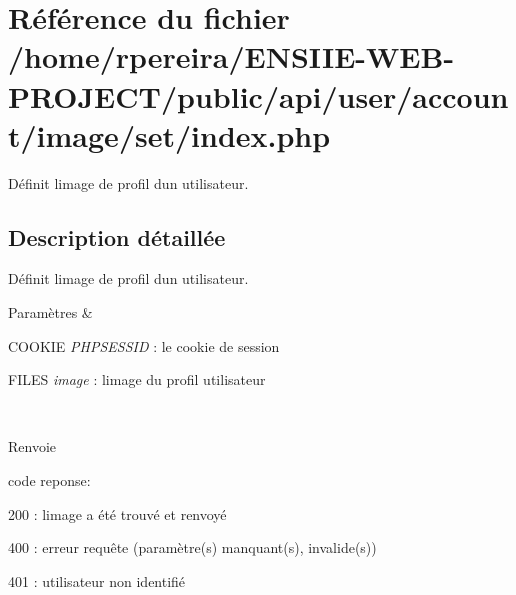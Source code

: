 \hypertarget{user_2account_2image_2set_2index_8php}{}\section{Référence du fichier /home/rpereira/\+E\+N\+S\+I\+I\+E-\/\+W\+E\+B-\/\+P\+R\+O\+J\+E\+C\+T/public/api/user/account/image/set/index.php}
\label{user_2account_2image_2set_2index_8php}


Définit l\textquotesingle{}image de profil d\textquotesingle{}un utilisateur.  




\subsection{Description détaillée}
Définit l\textquotesingle{}image de profil d\textquotesingle{}un utilisateur. 


\begin{DoxyParams}{Paramètres}
{\em } & 
\begin{DoxyItemize}
\item C\+O\+O\+K\+IE {\itshape P\+H\+P\+S\+E\+S\+S\+ID} \+: le cookie de session
\item F\+I\+L\+ES {\itshape image} \+: l\textquotesingle{}image du profil utilisateur 
\end{DoxyItemize}\\
\hline
\end{DoxyParams}
\begin{DoxyReturn}{Renvoie}

\begin{DoxyItemize}
\item code reponse\+:
\begin{DoxyItemize}
\item 200 \+: l\textquotesingle{}image a été trouvé et renvoyé
\item 400 \+: erreur requête (paramètre(s) manquant(s), invalide(s))
\item 401 \+: utilisateur non identifié 
\end{DoxyItemize}
\end{DoxyItemize}
\end{DoxyReturn}
